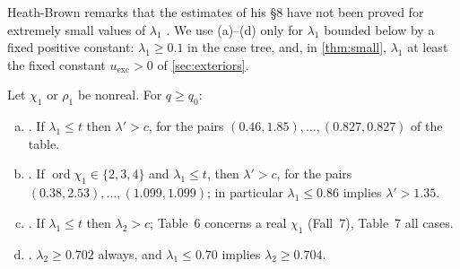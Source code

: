 \documentclass[11pt]{amsart}
\numberwithin{equation}{section}
\theoremstyle{plain}
\theoremstyle{definition}
\theoremstyle{remark}
\newcommand{\1}{\mathbf{1}}
\DeclareMathOperator{\ord}{ord}
\begin{document}
Heath-Brown remarks that the estimates of his \S8 have not been proved for extremely small values
of $\lambda_1$ \cite[\S8]{HeathBrown1992zero}. We use (a)--(d) only for $\lambda_1$ bounded below by a
fixed positive constant: $\lambda_1\ge0.1$ in the case tree, and, in \cref{thm:small}, $\lambda_1$ at
least the fixed constant $u_{\mathrm{exc}}>0$ of \cref{sec:exteriors}.

\begin{inp}\label{inp:complextables}
Let $\chi_1$ or $\rho_1$ be nonreal. For $q\ge q_0$:
\begin{enumerate}[(a)]
  \item \cite[Table~2$'$, p.~62]{Xylouris2011nullstellen}. If $\lambda_1\le t$ then $\lambda'>c$, for the pairs
    $(0.46,1.85),\dots,(0.827,0.827)$ of the table.
  \item \cite[Table~3, p.~45]{Xylouris2011nullstellen}. If $\ord\chi_1\in\{2,3,4\}$ and $\lambda_1\le t$, then
    $\lambda'>c$, for the pairs $(0.38,2.53),\dots,(1.099,1.099)$; in particular $\lambda_1\le0.86$ implies
    $\lambda'>1.35$.
  \item \cite[Tables~6 and~7, p.~53]{Xylouris2011nullstellen}. If $\lambda_1\le t$ then $\lambda_2>c$; Table~6
    concerns a real $\chi_1$ (Fall~7), Table~7 all cases.
  \item \cite[Lemma~9.4 and Table~10]{HeathBrown1992zero}. $\lambda_2\ge0.702$ always, and
    $\lambda_1\le0.70$ implies $\lambda_2\ge0.704$.
\end{enumerate}
\end{inp}
\end{document}
